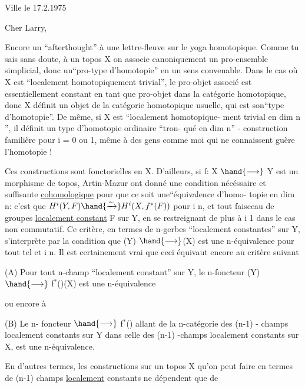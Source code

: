 

Ville le 17.2.1975

Cher Larry,

 Encore un ``afterthought'' à une lettre-fleuve  sur le yoga homotopique.
Comme tu sais sans doute, à un topos X on associe canoniquement un 
pro-ensemble simplicial, donc un``pro-type  d'homotopie'' en un sens convenable.
Dans le cas où X est ``localement homotopiquement trivial'', le pro-objet
associé est essentiellement constant en tant que pro-objet dans la catégorie
homotopique, donc X définit un objet de la catégorie homotopique usuelle,
qui est son\hand{|}``type d'homotopie''.  De même, si X est  ``localement homotopique-%
ment  trivial en dim \hand{$\leq$} n '', il définit un type d'homotopie  ordinaire ``tron-%
qué en dim \hand{$\leq$} n''  -  construction familière pour i = 0 ou 1, même à des
gens comme moi qui ne connaissent guère l'homotopie !

Ces constructions sont fonctorielles en X. D'ailleurs, si  f: X $\hand{\longrightarrow}$ Y
est un morphisme de topos,  Artin-Mazur ont donné  une condition nécéssaire
et suffisante  \uline{cohomologique}   pour que ce soit  une\hand{|}``équivalence d'homo-%
topie en dim \hand{$\leq$} n: c'est que  $H^{i}(Y,F) \hand{\xrightarrow{\sim}} H^{i}(X,f^{*}(F))$   pour i \hand{$\leq$} n, et
tout faisceau de groupes  \uline{localement constant}  F sur Y, en se restreignant
de plus à  i\hand{$\leq$} 1  dans le cas  non commutatif. Ce critère, en termes
de n-gerbes ``localement constantes''   sur Y, s'interprète par la condition
que  (Y) $\hand{\longrightarrow}$(X)   est une n-équivalence  pour tout tel  et  i\hand{$\leq$} n.
Il est certainement vrai que ceci équivaut encore au critère suivant

(A)  Pour tout n-champ  ``localement constant''   sur Y, le
n-foncteur  (Y) $\hand{\longrightarrow}$ f$^{*}$()(X)  est une n-équivalence

ou encore à

(B)  Le n- foncteur $\hand{\longrightarrow}$ f$^{*}$()   allant de la n-catégorie
des (n-1) - champs localement constants  sur Y dans celle des (n-1) -champs
localement  constants sur X,  est une n-équivalence.

En d'autres termes, les constructions sur un topos X  qu'on peut
faire en termes de (n-1) champs \uline{localement}  constants ne dépendent que de

